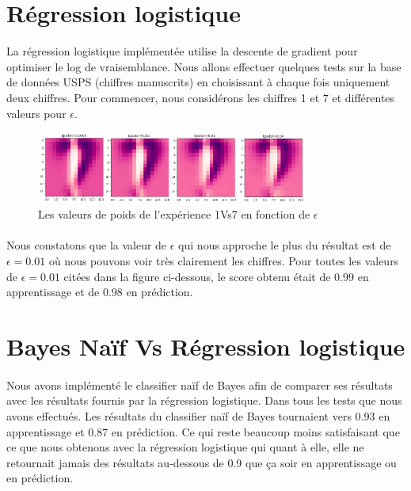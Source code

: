 \documentclass{report}
\begin{document}
\section{Régression logistique}
La régression logistique implémentée utilise la descente de gradient pour optimiser le log de vraisemblance. Nous allons effectuer quelques tests sur la base de données USPS (chiffres manuscrits) en choisissant à chaque fois uniquement deux chiffres. Pour commencer, nous considérons les chiffres 1 et 7 et différentes valeurs pour $\epsilon$. 
 \begin{figure}[H]
	\begin{center}
		\includegraphics[width=0.8\textwidth]{reg_log.png}
		\caption{Les valeurs de poids de l'expérience 1Vs7 en fonction de  $\epsilon$}
	\end{center}
\end{figure}
\paragraph{}
Nous constatons que la valeur de $\epsilon$ qui nous approche le plus du résultat est de $\epsilon=0.01$ où nous pouvons voir très clairement les chiffres. Pour toutes les valeurs de $\epsilon=0.01$ citées dans la figure ci-dessous, le score obtenu était de 0.99 en apprentissage et de 0.98 en prédiction. 

\section{Bayes Naïf Vs Régression logistique }
\paragraph{}
Nous avons implémenté le classifier naïf de Bayes afin de comparer ses résultats avec les résultats fournis par la régression logistique. Dans tous les tests que nous avons effectués. Les résultats du classifier naïf de Bayes tournaient vers 0.93 en apprentissage et 0.87 en prédiction. Ce qui reste beaucoup moins satisfaisant que ce que nous obtenons avec la régression logistique qui quant à elle, elle ne retournait jamais des résultats au-dessous de 0.9 que ça soir en apprentissage ou en prédiction.
\end{document}

